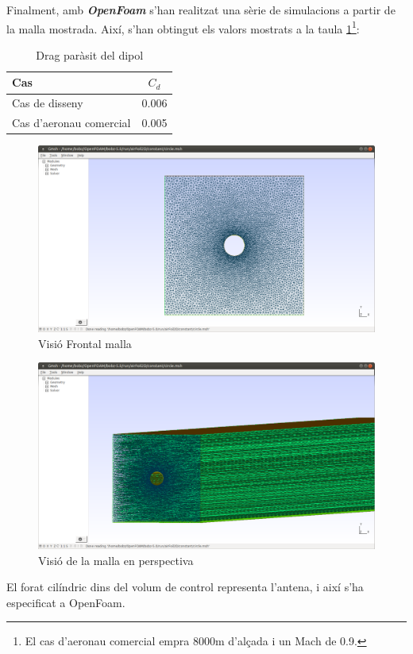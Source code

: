 Finalment, amb \textit{\textbf{OpenFoam}} s'han realitzat una sèrie de simulacions a partir de la malla mostrada. Així, s'han obtingut els valors mostrats a la taula \ref{C_opti2}\footnote{El cas d'aeronau comercial empra 8000m d'alçada i un Mach de 0.9.}:
\begin{table}[H]
	\centering
	\begin{tabular}{lc}
		\toprule[3pt]
		\textbf{Cas}&\textbf{$C_d$}\\
		\midrule[1pt]
		Cas de disseny & 0.006 \\
		Cas d'aeronau comercial & 0.005 \\
		\bottomrule[2pt]
	\end{tabular}
	\caption{Drag paràsit del dipol}
	\label{C_opti2}
\end{table}
\begin{figure}[H]
	\centering
	\includegraphics[width=\textwidth]{./images/malla1.pdf}
	\caption{Visió Frontal malla}
	\label{malla1}
\end{figure}
\begin{figure}[H]
	\centering
	\includegraphics[width=\textwidth]{./images/malla2.pdf}
	\caption{Visió de la malla en perspectiva}
	\label{malla2}
\end{figure}
El forat cilíndric dins del volum de control representa l'antena, i així s'ha especificat a OpenFoam.